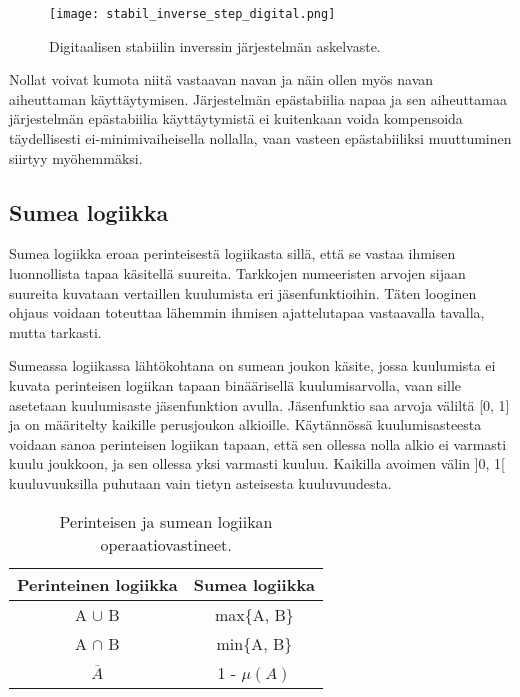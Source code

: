\documentclass[finnish,12pt]{article}
\begin{document}
\begin{figure}[h!]
\centering
\texttt{[image: stabil\_inverse\_step\_digital.png]}
\caption{Digitaalisen stabiilin inverssin järjestelmän askelvaste.}
\label{fig:stabil inverse digital step function}
\end{figure}

Nollat voivat kumota niitä vastaavan navan ja näin ollen myös navan aiheuttaman käyttäytymisen. Järjestelmän epästabiilia napaa ja sen aiheuttamaa järjestelmän epästabiilia käyttäytymistä ei kuitenkaan voida kompensoida täydellisesti ei-minimivaiheisella nollalla, vaan vasteen epästabiiliksi muuttuminen siirtyy myöhemmäksi. \cite{Hall2010}

\subsection{Sumea logiikka}

Sumea logiikka eroaa perinteisestä logiikasta sillä, että se vastaa ihmisen luonnollista tapaa käsitellä suureita. Tarkkojen numeeristen arvojen sijaan suureita kuvataan vertaillen kuulumista eri jäsenfunktioihin. Täten looginen ohjaus voidaan toteuttaa lähemmin ihmisen ajattelutapaa vastaavalla tavalla, mutta tarkasti.

Sumeassa logiikassa lähtökohtana on sumean joukon käsite, jossa kuulumista ei kuvata perinteisen logiikan tapaan binäärisellä kuulumisarvolla, vaan sille asetetaan kuulumisaste jäsenfunktion avulla. Jäsenfunktio saa arvoja väliltä [0, 1] ja on määritelty kaikille perusjoukon alkioille. Käytännössä kuulumisasteesta voidaan sanoa perinteisen logiikan tapaan, että sen ollessa nolla alkio ei varmasti kuulu joukkoon, ja sen ollessa yksi varmasti kuuluu. Kaikilla avoimen välin ]0, 1[ kuuluvuuksilla puhutaan vain tietyn asteisesta kuuluvuudesta. \cite[luku 2.1]{Harris1992}

\begin{table}[h!]
\centering
\begin{tabular}[b]{| c | c |}
\hline
\textbf{Perinteinen logiikka} & \textbf{Sumea logiikka} \\ \hline
A $\cup$ B & max\{A, B\} \\ \hline 
A $\cap$ B & min\{A, B\} \\ \hline
$\overline{A}$ & 1 - $\mu(A)$ \\ \hline
\end{tabular}
\caption{Perinteisen ja sumean logiikan operaatiovastineet.}
\label{tab:fuzzy_vs_conventional_logic}
\end{table}
\end{document}
